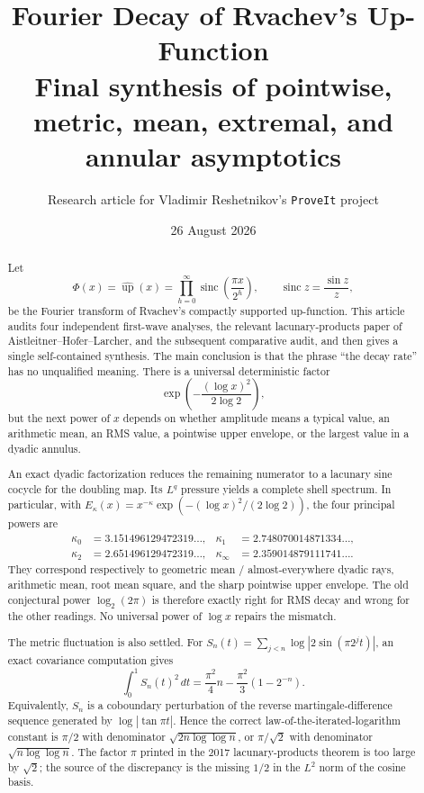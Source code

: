 \documentclass[11pt,oneside]{article}
\title{\bfseries Fourier Decay of Rvachev's Up-Function\\[0.35em]
\large Final synthesis of pointwise, metric, mean, extremal, and annular asymptotics}
\author{Research article for Vladimir Reshetnikov's \texttt{ProveIt} project}
\date{26 August 2026}
\theoremstyle{definition}
\theoremstyle{remark}
\newcommand{\Up}{\operatorname{up}}
\newcommand{\sinc}{\operatorname{sinc}}
\begin{document}
\maketitle

\begin{abstract}
Let
\[
 \Phi(x)=\widehat{\Up}(x)
 =\prod_{h=0}^{\infty}\sinc\!\left(\frac{\pi x}{2^h}\right),
 \qquad \sinc z=\frac{\sin z}{z},
\]
be the Fourier transform of Rvachev's compactly supported up-function.  This article audits
four independent first-wave analyses, the relevant lacunary-products paper of
Aistleitner--Hofer--Larcher, and the subsequent comparative audit, and then gives a single
self-contained synthesis.  The main conclusion is that the phrase ``the decay rate'' has no
unqualified meaning.  There is a universal deterministic factor
\[
 \exp\!\left(-\frac{(\log x)^2}{2\log2}\right),
\]
but the next power of $x$ depends on whether amplitude means a typical value, an arithmetic
mean, an RMS value, a pointwise upper envelope, or the largest value in a dyadic annulus.

An exact dyadic factorization reduces the remaining numerator to a lacunary sine cocycle for
the doubling map.  Its $L^q$ pressure yields a complete shell spectrum.  In particular, with
$E_\kappa(x)=x^{-\kappa}\exp(- (\log x)^2/(2\log2))$, the four principal powers are
\[
 \begin{aligned}
 \kappa_0&=3.151496129472319\ldots,&
 \kappa_1&=2.748070014871334\ldots,\\
 \kappa_2&=2.651496129472319\ldots,&
 \kappa_\infty&=2.359014879111741\ldots .
 \end{aligned}
\]
They correspond respectively to geometric mean / almost-everywhere dyadic rays, arithmetic
mean, root mean square, and the sharp pointwise upper envelope.  The old conjectural power
$\log_2(2\pi)$ is therefore exactly right for RMS decay and wrong for the other readings.
No universal power of $\log x$ repairs the mismatch.

The metric fluctuation is also settled.  For
$S_n(t)=\sum_{j<n}\log|2\sin(\pi2^jt)|$, an exact covariance computation gives
\[
 \int_0^1S_n(t)^2\,dt
 =\frac{\pi^2}{4}n-\frac{\pi^2}{3}(1-2^{-n}).
\]
Equivalently, $S_n$ is a coboundary perturbation of the reverse martingale-difference
sequence generated by $\log|\tan\pi t|$.  Hence the correct law-of-the-iterated-logarithm
constant is $\pi/2$ with denominator $\sqrt{2n\log\log n}$, or $\pi/\sqrt2$ with denominator
$\sqrt{n\log\log n}$.  The factor $\pi$ printed in the 2017 lacunary-products theorem is too
large by $\sqrt2$; the source of the discrepancy is the missing $1/2$ in the $L^2$ norm of
the cosine basis.


\end{abstract}
\end{document}

